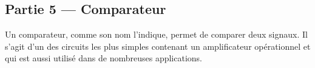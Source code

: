 \documentclass[canadien,12pt,oneside,letterpaper]{article}
\begin{document}






\subsection{Partie 5 --- Comparateur}
Un comparateur, comme son nom l'indique, permet de comparer deux signaux.  Il s'agit d'un des circuits les plus simples contenant un amplificateur opérationnel et qui est aussi utilisé dans de nombreuses applications.
\end{document}
